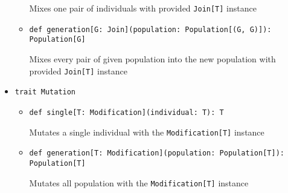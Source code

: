 \begin{itemize}
\begin{itemize}
	Mixes one pair of individuals with provided \texttt{Join[T]} instance 

	\item \texttt{def generation[G: Join](population: Population[(G, G)]): Population[G]}

	Mixes every pair of given population into the new population with provided \texttt{Join[T]} instance
\end{itemize}

\smallskip
\item \texttt{trait Mutation}
\begin{itemize}
	\item \texttt{def single[T: Modification](individual: T): T}

	Mutates a single individual with the \texttt{Modification[T]} instance 

	\item \texttt{def generation[T: Modification](population: Population[T]): Population[T]}

	Mutates all population with the \texttt{Modification[T]} instance
\end{itemize}

\end{itemize}


